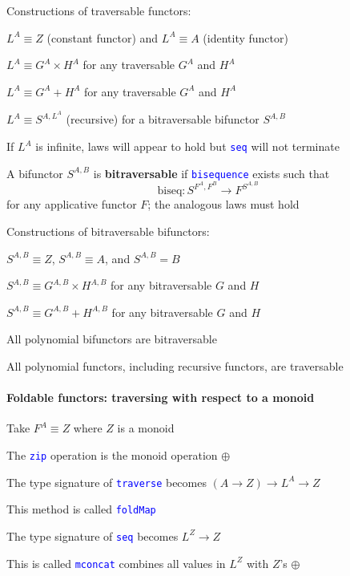 Constructions of traversable functors:

$L^{A}\equiv Z$ (constant functor) and $L^{A}\equiv A$ (identity
functor)

$L^{A}\equiv G^{A}\times H^{A}$ for any traversable $G^{A}$ and
$H^{A}$

$L^{A}\equiv G^{A}+H^{A}$ for any traversable $G^{A}$ and $H^{A}$

$L^{A}\equiv S^{A,L^{A}}$ (recursive) for a bitraversable bifunctor
$S^{A,B}$ 

If $L^{A}$ is infinite, laws will appear to hold but \texttt{\textcolor{blue}{\footnotesize{}seq}}
will not terminate

A bifunctor $S^{A,B}$ is \textbf{bitraversable} if \texttt{\textcolor{blue}{\footnotesize{}bisequence}}
exists such that
\[
\text{biseq}:S^{F^{A},F^{B}}\rightarrow F^{S^{A,B}}
\]
 for any applicative functor $F$; the analogous laws must hold

Constructions of bitraversable bifunctors:

$S^{A,B}\equiv Z$, $S^{A,B}\equiv A$, and $S^{A,B}=B$

$S^{A,B}\equiv G^{A,B}\times H^{A,B}$ for any bitraversable $G$
and $H$

$S^{A,B}\equiv G^{A,B}+H^{A,B}$ for any bitraversable $G$ and $H$

All polynomial bifunctors are bitraversable

All polynomial functors, including recursive functors, are traversable


\paragraph{Foldable functors: traversing with respect to a monoid}

\vspace{-0.15cm}Take $F^{A}\equiv Z$ where $Z$ is a monoid

The \texttt{\textcolor{blue}{\footnotesize{}zip}} operation is the
monoid operation $\oplus$

The type signature of \texttt{\textcolor{blue}{\footnotesize{}traverse}}
becomes $\left(A\rightarrow Z\right)\rightarrow L^{A}\rightarrow Z$

This method is called \texttt{\textcolor{blue}{\footnotesize{}foldMap}} 

The type signature of \texttt{\textcolor{blue}{\footnotesize{}seq}}
becomes $L^{Z}\rightarrow Z$

This is called \texttt{\textcolor{blue}{\footnotesize{}mconcat}} \textendash{}
combines all values in $L^{Z}$ with $Z$'s $\oplus$


